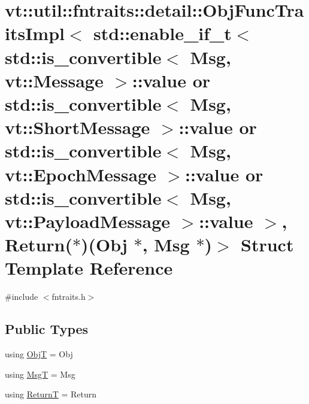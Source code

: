 \hypertarget{structvt_1_1util_1_1fntraits_1_1detail_1_1_obj_func_traits_impl_3_01std_1_1enable__if__t_3_01std573a703ad4f1a8441021e31e0f1928d5}{}\section{vt\+:\+:util\+:\+:fntraits\+:\+:detail\+:\+:Obj\+Func\+Traits\+Impl$<$ std\+:\+:enable\+\_\+if\+\_\+t$<$ std\+:\+:is\+\_\+convertible$<$ Msg, vt\+:\+:Message $>$\+:\+:value or std\+:\+:is\+\_\+convertible$<$ Msg, vt\+:\+:Short\+Message $>$\+:\+:value or std\+:\+:is\+\_\+convertible$<$ Msg, vt\+:\+:Epoch\+Message $>$\+:\+:value or std\+:\+:is\+\_\+convertible$<$ Msg, vt\+:\+:Payload\+Message $>$\+:\+:value $>$, Return($\ast$)(Obj $\ast$, Msg $\ast$)$>$ Struct Template Reference}
\label{structvt_1_1util_1_1fntraits_1_1detail_1_1_obj_func_traits_impl_3_01std_1_1enable__if__t_3_01std573a703ad4f1a8441021e31e0f1928d5}


{\ttfamily \#include $<$fntraits.\+h$>$}

\subsection*{Public Types}
\begin{DoxyCompactItemize}
\item 
using \hyperlink{structvt_1_1util_1_1fntraits_1_1detail_1_1_obj_func_traits_impl_3_01std_1_1enable__if__t_3_01std573a703ad4f1a8441021e31e0f1928d5_a7d703d5a1f0330b7b6cbb5e221d9f8c5}{ObjT} = Obj
\item 
using \hyperlink{structvt_1_1util_1_1fntraits_1_1detail_1_1_obj_func_traits_impl_3_01std_1_1enable__if__t_3_01std573a703ad4f1a8441021e31e0f1928d5_aec757e31d67acee2fae6ef7c455367db}{MsgT} = Msg
\item 
using \hyperlink{structvt_1_1util_1_1fntraits_1_1detail_1_1_obj_func_traits_impl_3_01std_1_1enable__if__t_3_01std573a703ad4f1a8441021e31e0f1928d5_a45ecfa42e04b5fb93a9702866a82ba07}{ReturnT} = Return
\end{DoxyCompactItemize}

